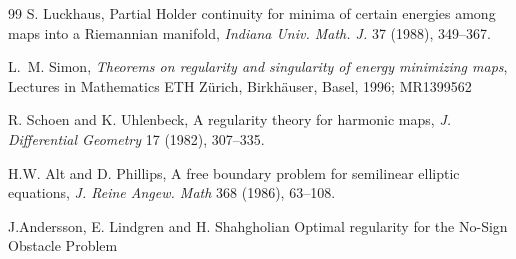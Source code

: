 \documentclass[11pt]{amsart}
\theoremstyle{plain}
\theoremstyle{definition}
\theoremstyle{remark}
\numberwithin{equation}{section}
\begin{document}
\begin{thebibliography}{99}
S. Luckhaus,
Partial Holder continuity for minima of certain energies among maps into a Riemannian manifold,
{\it Indiana Univ. Math. J.}  37 (1988), 349--367.

L.~M. Simon, 
{\it Theorems on regularity and singularity of energy minimizing maps}, 
Lectures in Mathematics ETH Z\"urich, Birkh\"auser, Basel, 1996; MR1399562

R. Schoen and K. Uhlenbeck,
A regularity theory for harmonic maps,
{\it J. Differential Geometry} 17 (1982), 307--335.

H.W. Alt and D. Phillips,
A free boundary problem for semilinear elliptic equations,
{\it J. Reine Angew. Math} 368 (1986), 63--108.

J.Andersson, E. Lindgren and H. Shahgholian
Optimal regularity for the No-Sign Obstacle Problem

\end{thebibliography}
\end{document}
